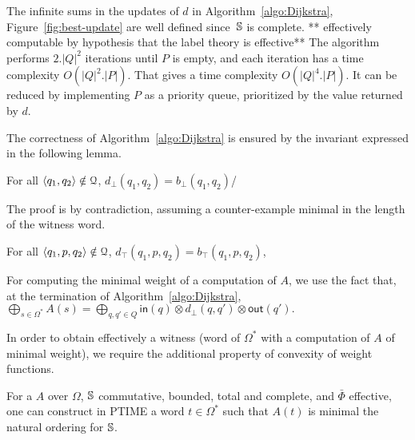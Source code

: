 \noindent
{}
The infinite sums in the updates of $d$ in Algorithm~\ref{algo:Dijkstra},
Figure~\ref{fig:best-update}
are well defined
since~$\mathbb{S}$ is complete.
** effectively computable by hypothesis that the label theory is effective**
The algorithm performs $2.|Q|^2$ iterations until $P$ is empty,
and each iteration has a time complexity $O(|Q|^2 . |P|)$.
That gives a time complexity $O(|Q|^4 . |P|)$.
It can be reduced by implementing $P$ as a priority queue,
prioritized by the value returned by $d$.

The correctness of Algorithm~\ref{algo:Dijkstra}
is ensured by the invariant expressed in the following lemma.
\begin{lemma}\label{lem:bot}
For all $\< q_1, q_2> \notin \Q$,
$d_\bot(q_1, q_2) =  b_\bot(q_1, q_2)$/
\end{lemma}
The proof is by contradiction,
assuming a counter-example minimal in the length of the witness word.

\begin{lemma}\label{lem:top}
For all $\< q_1, p, q_2> \notin \Q$,
$d_\top(q_1, p, q_2) =  b_\top(q_1, p, q_2)$,
\end{lemma}

\noindent
For computing the minimal weight of a computation of $A$, we use the fact that,
at the termination of Algorithm~\ref{algo:Dijkstra}, %
\(
  {\displaystyle \bigoplus_{s \in \Omega^*} A(s)} =
  {\displaystyle\bigoplus_{q, q' \in Q}} \textstyle
  \mathsf{in}(q) \mathop{\otimes} d_\bot(q, q') \mathop{\otimes} \mathsf{out}(q').
\)

\noindent
In order to obtain effectively a witness
(word of $\Omega^*$ with a computation of $A$ of minimal weight),
we require the additional property of convexity of weight functions.

\begin{proposition}\label{th:best-search}
For a \SWVPA $A$
over $\Omega$,
$\mathbb{S}$ commutative, bounded, total and complete, %
and $\bar\Phi$ effective, %
one can construct in PTIME a word $t \in \Omega^*$
such that $A(t)$ is minimal \wrt the natural ordering for $\mathbb{S}$.
\end{proposition}





